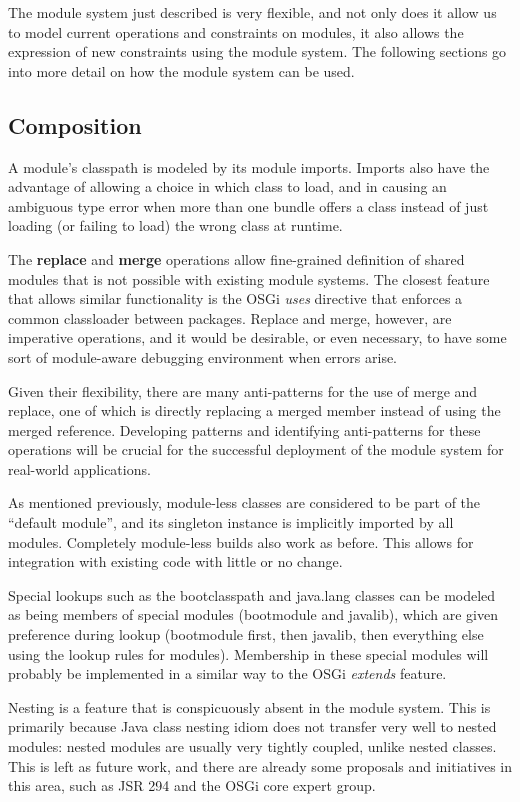 The module system just described is very flexible, and not only does it
allow us to model current operations and constraints on modules, it also
allows the expression of new constraints using the module system. The following
sections go into more detail on how the module system can be used.

\subsection{Composition}

A module's classpath is modeled by its module imports. Imports also have the advantage
of allowing a choice in which class to load, and in causing an
ambiguous type error  when more than one bundle offers
a class instead of just loading (or failing to load) the wrong class at runtime.

The \textbf{replace} and \textbf{merge} operations allow fine-grained
definition of shared modules that is not possible with existing
module systems. The closest feature that allows similar functionality
is the OSGi \textit{uses} directive that enforces a common classloader
between packages. Replace and merge, however, are imperative operations, and it would
be desirable, or even necessary, to have some sort of module-aware 
debugging environment when errors arise. 

Given their flexibility,
there are many anti-patterns for the use of merge and replace, one of which
is directly replacing a merged member instead of using the merged reference.
Developing patterns and identifying anti-patterns for these operations will be
crucial for the successful deployment of the module system for real-world applications.

As mentioned previously, module-less classes are considered to be part 
of the ``default module'', and its singleton instance is implicitly 
imported by all modules. Completely module-less builds also work as before.
This allows for integration with existing code with little or no change.

Special lookups such as the bootclasspath and java.lang classes can be
modeled as being members of special modules (bootmodule and javalib), 
which are given preference during lookup (bootmodule first, then javalib,
then everything else using the lookup rules for modules). Membership
in these special modules will probably be implemented in a similar way to
the OSGi \textit{extends} feature.

Nesting is a feature that is conspicuously absent in the module system. This
is primarily because Java class nesting idiom does not transfer very well to
nested modules: nested modules are usually very tightly coupled, unlike nested
classes. This is left as future work, and there are already some proposals
and initiatives in this area, such as JSR 294 and the OSGi core expert group.


